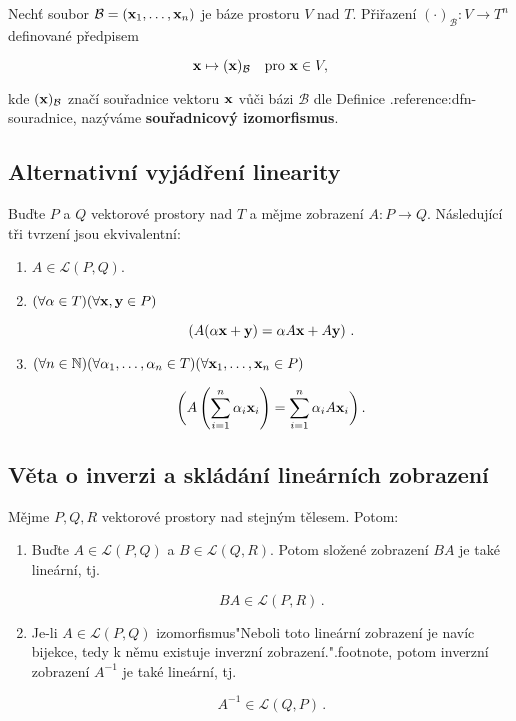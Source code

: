 Nechť soubor $\mathcal B=(\mathbf{x}_1,\dots,\mathbf{x}_n)$ je báze prostoru $V$ nad $T$.
Přiřazení $(\cdot)_{\mathcal B}:V\to T^n$ definované předpisem

\[ \mathbf{x}\mapsto (\mathbf{x})_{\mathcal B} \quad \text{pro } \mathbf{x}\in V, \]

\noindent kde $(\mathbf{x})_{\mathcal B}$ značí souřadnice vektoru $\mathbf{x}$ vůči bázi $\mathcal B$
dle Definice .reference:dfn-souradnice, nazýváme \textbf{souřadnicový
      izomorfismus}.

\subsection*{Alternativní vyjádření linearity}

Buďte $P$ a $Q$ vektorové prostory nad $T$ a mějme zobrazení $A:P\rightarrow
      Q$. Následující tři tvrzení jsou ekvivalentní:

\begin{enumerate}
      \item $A\in\mathcal L(P,Q)$.
      \item $(\forall \alpha\in T)(\forall \mathbf{x},\mathbf{y}\in P)$

            \[ \left(A(\alpha \mathbf{x}+ \mathbf{y})=\alpha A\mathbf{x}+ A\mathbf{y}\right)\,. \]

      \item $(\forall n\in\mathbb{N})(\forall \alpha_{1},\dots,\alpha_{n}\in T)(\forall \mathbf{x}_{1},\dots, \mathbf{x}_{n}\in P)$

            \[ \bigg(A\left(\sum_{i=1}^{n}\alpha_{i}\mathbf{x}_{i}\right)=\sum_{i=1}^{n}\alpha_{i}A\mathbf{x}_{i}\bigg)\,. \]

\end{enumerate}

\subsection*{Věta o inverzi a skládání lineárních zobrazení}

Mějme $P,Q,R$ vektorové prostory nad stejným tělesem. Potom:

\begin{enumerate}
      \item Buďte $A\in\mathcal L(P,Q)$ a $B\in\mathcal L(Q,R)$. Potom složené zobrazení
            $BA$ je také lineární, tj.

            \[ BA\in\mathcal L(P,R)\,. \]

      \item Je-li $A\in\mathcal L(P,Q)$ izomorfismus"Neboli toto lineární zobrazení je
            navíc bijekce, tedy k němu existuje inverzní zobrazení.".footnote, potom
            inverzní zobrazení $A^{-1}$ je také lineární, tj.

            \[ A^{-1}\in\mathcal L(Q,P)\,. \]
\end{enumerate}

